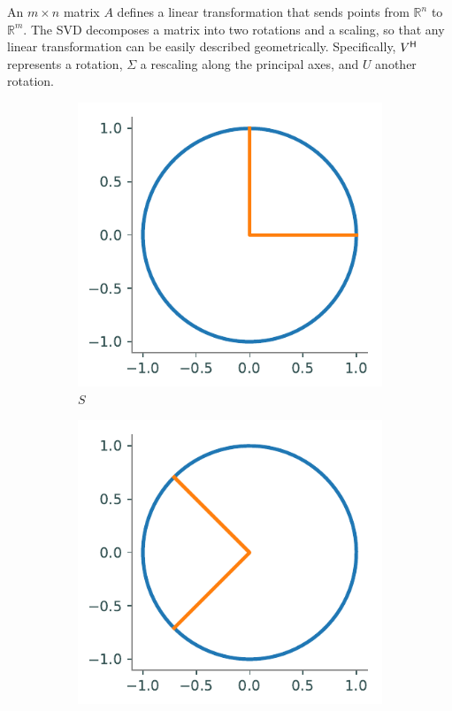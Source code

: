 An $m\times n$ matrix $A$ defines a linear transformation that sends points from $\mathbb{R}^n$ to $\mathbb{R}^m$.
The SVD decomposes a matrix into two rotations and a scaling, so that any linear transformation can be easily described geometrically.
Specifically, $V^{\mathsf H}$ represents a rotation, $\Sigma$ a rescaling along the principal axes, and $U$ another rotation.

\begin{figure}
\centering
\begin{subfigure}{.35\textwidth}
  \centering
  \includegraphics[width=\textwidth]{figures/unit_circle.pdf}
  \caption{$S$}
\end{subfigure}
\quad
\begin{subfigure}{.35\textwidth}
  \centering
  \includegraphics[width=\textwidth]{figures/vcircle.pdf}

\end{subfigure}
\end{figure}
